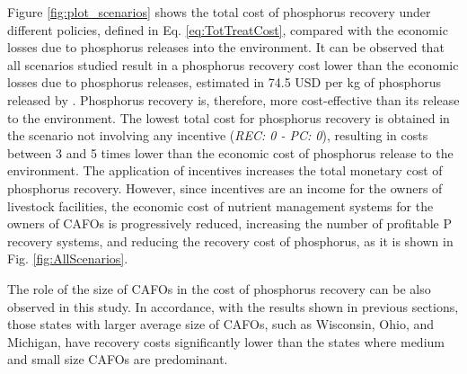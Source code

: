 \begin{refsection}[referencesCh5]
Figure \ref{fig:plot_scenarios} shows the total cost of phosphorus recovery under different policies, defined in Eq. \ref{eq:TotTreatCost}, compared with the economic losses due to phosphorus releases into the environment. It can be observed that all scenarios studied result in a phosphorus recovery cost lower than the economic losses due to phosphorus releases, estimated in 74.5 USD per kg of phosphorus released by \citet{Sampat2020}. Phosphorus recovery is, therefore, more cost-effective than its release to the environment. The lowest total cost for phosphorus recovery is obtained in the scenario not involving any incentive (\textit{REC: 0 - PC: 0}), resulting in costs between 3 and 5 times lower than the economic cost of phosphorus release to the environment. The application of incentives increases the total monetary cost of phosphorus recovery.
However, since incentives are an income for the owners of livestock facilities, the economic cost of nutrient management systems for the owners of CAFOs is progressively reduced, increasing the number of profitable P recovery systems, and reducing the recovery cost of phosphorus, as it is shown in Fig. \ref{fig:AllScenarios}.

The role of the size of CAFOs in the cost of phosphorus recovery can be also observed in this study. In accordance, with the results shown in previous sections, those states with larger average size of CAFOs, such as Wisconsin, Ohio, and Michigan, have recovery costs significantly lower than the states where medium and small size CAFOs are predominant. 




\end{refsection}
